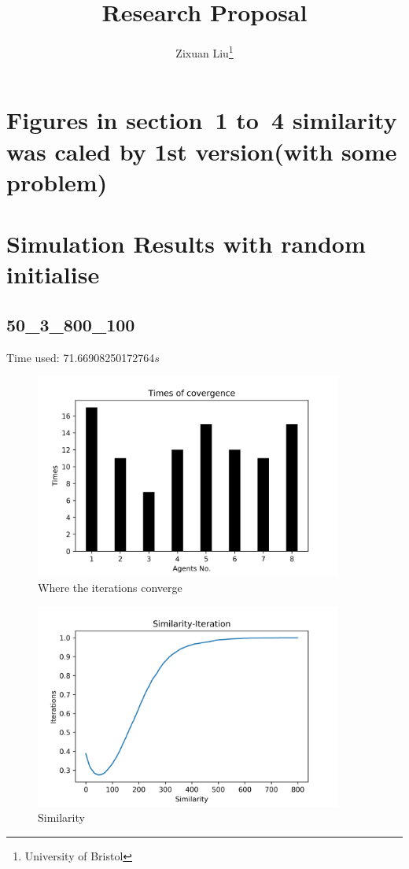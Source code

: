 \documentclass[a4paper,12pt]{article}
\title{Research Proposal}
\author{Zixuan Liu\thanks{University of Bristol}}
\begin{document}
	\section*{Figures in section~1 to~4 similarity was caled by 1st version(with some problem)} 
	\section{Simulation Results with random initialise}\label{SRRI}
	\graphicspath{{figs/}}
	\subsection{50\_3\_800\_100}
	Time used: 71.66908250172764${s}$
	\begin{figure}[H]
		\centering
		\includegraphics[width=0.9\textwidth]{agt50_3_800_100}
		\caption{Where the iterations converge}\label{agt50_3_800_100}
	\end{figure}
%
	\begin{figure}[H]
		\centering
		\includegraphics[width=0.9\textwidth]{Sim50_3_800_100}
		\caption{Similarity}\label{Sim50_3_800_100}
	\end{figure}
\end{document}
